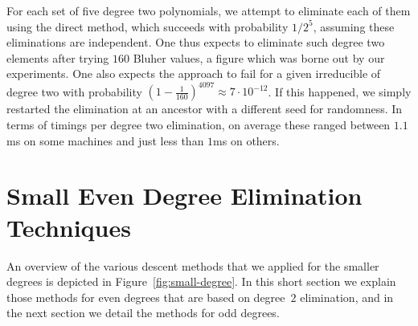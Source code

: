\documentclass[11pt]{llncs}
\begin{document}
For each set of five degree two polynomials, we attempt to eliminate each of them using the direct method, which succeeds with probability $1/2^5$, assuming these eliminations are independent. One thus expects to eliminate such degree two elements after trying $160$ Bluher values, a figure which 
was borne out by our experiments. One also expects the approach to fail for a given irreducible of degree two with probability 
$(1 \!-\! \frac 1 {160})^{4097} \approx 7 \!\cdot\! 10^{-12}$.
If this happened, we simply restarted the elimination at an ancestor with a
different seed for randomness.
In terms of timings per degree two elimination, on average these ranged between $1.1$ms on some machines 
and just less than $1$ms on others.


\section{Small Even Degree Elimination Techniques}\label{sec:smalleven}

An overview of the various descent methods that we applied for the
smaller degrees is depicted in Figure~\ref{fig:small-degree}.  In this
short section we explain those methods for even degrees that are based on
degree~$2$ elimination, and in the next section we detail the methods
for odd degrees.
\end{document}
